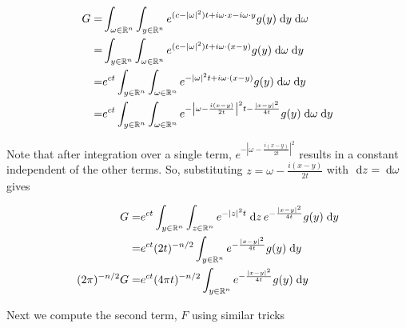 \begin{align*}
  G = &\int_{\omega \in \mathbb{R}^n} \int_{y \in \mathbb{R}^n} e^{(c - |\omega|^2) t + i \omega \cdot x - i \omega \cdot y} g(y) \;\mathrm{d}y \;\mathrm{d}\omega\\
    = &\int_{y \in \mathbb{R}^n} \int_{\omega \in \mathbb{R}^n} e^{(c - |\omega|^2) t + i \omega \cdot (x - y)} g(y) \;\mathrm{d}\omega \;\mathrm{d}y\\
    = &e^{c t} \int_{y \in \mathbb{R}^n} \int_{\omega \in \mathbb{R}^n} e^{-|\omega|^2 t + i \omega \cdot (x - y)} g(y) \;\mathrm{d}\omega \;\mathrm{d}y\\
    = &e^{c t} \int_{y \in \mathbb{R}^n} \int_{\omega \in \mathbb{R}^n} e^{-\left|\omega - \frac{i (x - y)}{2 t}\right|^2 t - \frac{|x - y|^2}{4 t}} g(y) \;\mathrm{d}\omega \;\mathrm{d}y\\
\end{align*}

Note that after integration over a single term, $e^{-|\omega - \frac{i (x - y)}{2 t}|^2}$ results in a constant independent of the other terms.
So, substituting $z = \omega - \frac{i (x - y)}{2 t}$ with $\;\mathrm{d}z = \;\mathrm{d}\omega$ gives

\begin{align*}
  G = &e^{c t} \int_{y \in \mathbb{R}^n} \int_{z \in \mathbb{R}^n} e^{-|z|^2 t} \;\mathrm{d}z\, e^{-\frac{|x - y|^2}{4 t}} g(y) \;\mathrm{d}y\\
    = &e^{c t} (2 t)^{-n / 2} \int_{y \in \mathbb{R}^n} e^{-\frac{|x - y|^2}{4 t}} g(y) \;\mathrm{d}y\\
  (2 \pi)^{-n / 2} G = &e^{c t} (4 \pi t)^{-n / 2} \int_{y \in \mathbb{R}^n} e^{-\frac{|x - y|^2}{4 t}} g(y) \;\mathrm{d}y
\end{align*}

Next we compute the second term, $F$ using similar tricks

